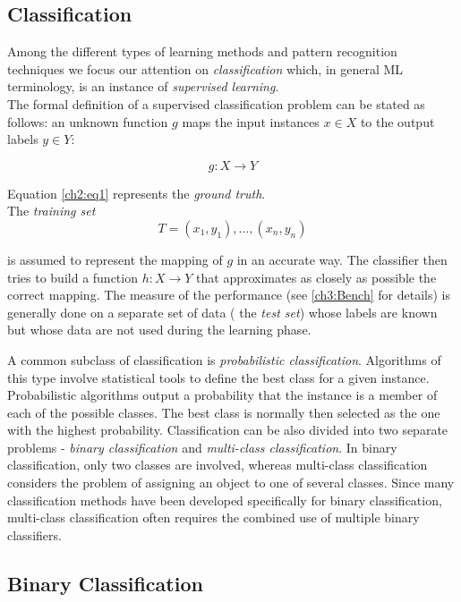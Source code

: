 \subsection{Classification}

Among the different types of learning methods and pattern recognition techniques we focus our attention on \textit{classification} which, in general \Gls{ML} 
terminology, is an instance of \textit{supervised learning}.\\
The formal definition of a supervised classification problem can be stated as follows: an unknown function $g$ maps the input instances $x \in X$ to the output labels $y \in Y$:

\begin{equation}
 \label{ch2:eq1}
 g: X \rightarrow Y
\end{equation}

Equation \ref{ch2:eq1} represents the \textit{ground truth}.\\
The \textit{training set}
\begin{equation}
 T = { (x_1,y_1), \ldots ,(x_n,y_n) }
\end{equation}

is assumed to represent the mapping of $g$ in an accurate way. The classifier then tries to build a function $h: X \rightarrow Y$ that approximates as closely as possible the correct mapping. The measure of the performance
(see \ref{ch3:Bench} for details) is generally done on a separate set of data ( the \textit{test set}) whose labels are known but whose data are not used during the learning phase\cite{liu2006pattern}.

A common subclass of classification is \textit{probabilistic classification}. Algorithms of this type involve statistical tools to define the best class for a given instance\cite{ML_gaussian}.
Probabilistic algorithms output a probability that the instance is a member of each of the possible classes. The best class is normally then selected as the one with the highest probability.
Classification can be also divided into two separate problems - \textit{binary classification} and \textit{multi-class classification}.
In binary classification, only two classes are involved, whereas multi-class classification considers the problem of assigning an object to one of several classes.
Since many classification methods have been developed specifically for binary classification, multi-class classification often requires the combined use of multiple binary classifiers.

\subsection{Binary Classification}

